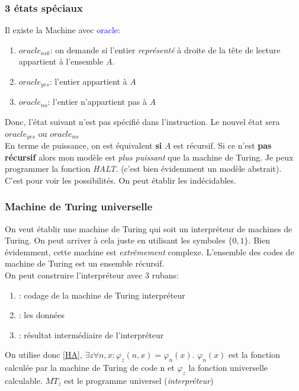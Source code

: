 \documentclass{report}
\begin{document}
\subsubsection{3 états spéciaux}
Il existe la Machine avec \textcolor{blue}{oracle}:
\begin{enumerate}
\item $oracle_{ask}$: on demande si l'entier \textit{représenté} à droite de la tête de lecture appartient à l'ensemble $A$.
\item $oracle_{yes}$: l'entier appartient à $A$
\item $oracle_{no}$: l'entier n'appartient pas à $A$
\end{enumerate}
Donc, l'état suivant n'est pas spécifié dans l'instruction. Le nouvel état sera $oracle_{yes}$ ou $oracle_{no}$\\
En terme de puissance, on est équivalent \textbf{si} $A$ est récursif. Si ce n'est \textbf{pas récursif} alors mon modèle est \textit{plus puissant} que la machine de Turing. Je peux programmer la fonction \textit{HALT}. (c'est bien évidemment un modèle abstrait).\\


C'est pour voir les possibilités. On peut établir les indécidables.

\subsubsection{Machine de Turing universelle}
On veut établir une machine de Turing qui soit un interpréteur de machines de Turing. On peut arriver à cela juste en utilisant les symboles $\{0, 1\}$. Bien évidemment, cette machine est \textit{extrêmement} complexe. L'ensemble des codes de machine de Turing est un ensemble récursif.\\

On peut construire l'interpréteur avec 3 rubans:
\begin{enumerate}
\item : codage de la machine de Turing interpréteur
\item : les données
\item : résultat intermédiaire de l'interpréteur
\end{enumerate}
On utilise donc \ref{HA}, $\exists z \forall n , x : \varphi_z(n,x) = \varphi_n(x)$. $\varphi_n(x)$ est la fonction calculée par la machine de Turing de code n et $\varphi_z$ la fonction universelle calculable. $MT_z$ est le programme universel (\textit{interpréteur})\\
\end{document}
